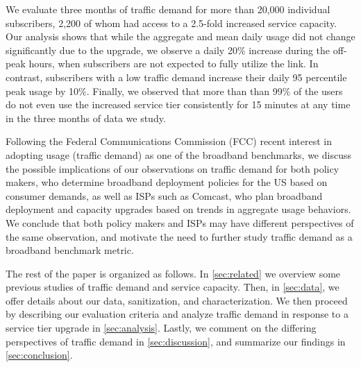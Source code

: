 We evaluate three months of traffic demand for more than 20,000 
individual subscribers, 2,200 of whom had access to a 2.5-fold increased 
service capacity. Our analysis shows that while the aggregate and mean daily 
usage did not change significantly due to the upgrade, we observe a daily 20\% 
increase during the off-peak hours, when subscribers are not expected to fully 
utilize the link.
 In contrast, subscribers with a low traffic demand 
increase their daily 95 percentile peak usage by 10\%. Finally, we observed 
that more than than 99\% of the users do not even use the increased service 
tier consistently for 15 minutes at any time in the three months of data we 
study.

Following the Federal Communications Commission (FCC) recent interest in 
adopting usage (traffic demand) as one of the broadband benchmarks, we discuss 
the possible implications of our observations on traffic demand for both policy 
makers, who determine broadband deployment policies for the US based on consumer 
demands, as well as ISPs such as Comcast, who plan broadband deployment and 
capacity upgrades based on trends in aggregate usage behaviors. We conclude that 
both policy makers and ISPs may have different perspectives of the same 
observation, and motivate the need to further study traffic demand as a 
broadband benchmark metric.

The rest of the paper is organized as follows. In \autoref{sec:related} we 
overview some previous studies of traffic demand and service capacity. Then, in 
\autoref{sec:data}, we offer details about our data, sanitization, and 
characterization. We then proceed by describing our evaluation criteria and 
analyze traffic demand in response to a service tier upgrade in 
\autoref{sec:analysis}.
Lastly, we comment on the differing perspectives of traffic demand in 
\autoref{sec:discussion}, and summarize our findings in 
\autoref{sec:conclusion}.
